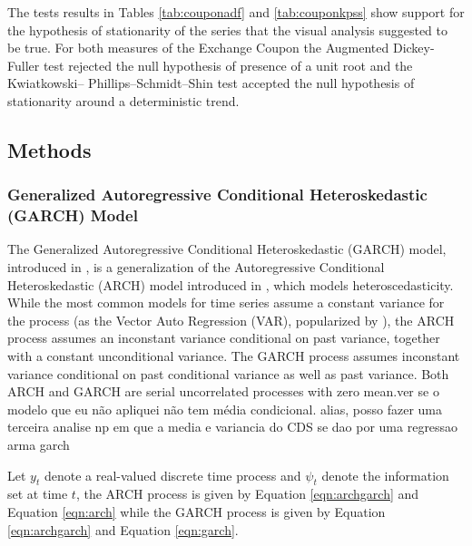 \documentclass[cic,tc, english]{iiufrgs}
\begin{document}
    

    

    The tests results in Tables \ref{tab:couponadf} and \ref{tab:couponkpss} show support for the hypothesis of stationarity of the series that the visual analysis suggested to be true. For both measures of the Exchange Coupon the Augmented Dickey-Fuller test rejected the null hypothesis of presence of a unit root and the Kwiatkowski– Phillips–Schmidt–Shin test accepted the null hypothesis of stationarity around a deterministic trend.
    
    \begin{comment}
        On ten of October 2015 a impeachment request for president Dilma Rousseff was handed to the Chamber Of Representatives' president, who accepted the request on December second. The opening of the impeachment process was accepted by the special impeachment committee on eleven of April 2016.
    \end{comment}

\subsection{Methods} \label{chapter_methods}

\subsubsection{Generalized Autoregressive Conditional Heteroskedastic (GARCH) Model}

    The Generalized Autoregressive Conditional Heteroskedastic (GARCH) model, introduced in \citet{bollerslev1986}, is a generalization of the Autoregressive Conditional Heteroskedastic (ARCH) model introduced in \citet{engle1982}, which models heteroscedasticity. While the most common models for time series assume a constant variance for the process (as the Vector Auto Regression (VAR), popularized by \citet{var}), the ARCH process assumes an inconstant variance conditional on past variance, together with a constant unconditional variance. The GARCH process assumes inconstant variance conditional on past conditional variance as well as past variance. Both ARCH and GARCH are serial uncorrelated processes with zero mean.{ver se o modelo que eu não apliquei não tem média condicional. alias, posso fazer uma terceira analise np em que a media e variancia do CDS se dao por uma regressao arma garch}

    Let $y_t$ denote a real-valued discrete time process and $\psi_t$ denote the information set at time $t$, the ARCH process is given by Equation \ref{eqn:archgarch} and Equation \ref{eqn:arch} while the GARCH process is given by Equation \ref{eqn:archgarch} and Equation \ref{eqn:garch}.
\end{document}
